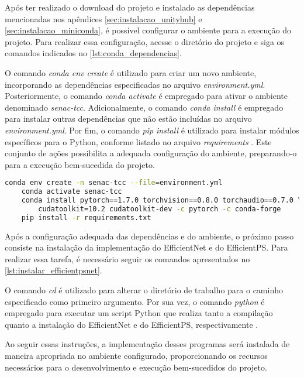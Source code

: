Após ter realizado o download do projeto e instalado as dependências mencionadas nos apêndices \ref{sec:instalacao_unityhub} e \ref{sec:instalacao_miniconda}, é possível configurar o ambiente para a execução do projeto. Para realizar essa configuração, acesse o diretório do projeto e siga os comandos indicados no \cref{lst:conda_dependencias}.

O comando \emph{conda env create} é utilizado para criar um novo ambiente, incorporando as dependências especificadas no arquivo \emph{environment.yml}. Posteriormente, o comando \emph{conda activate} é empregado para ativar o ambiente denominado \emph{senac-tcc}. Adicionalmente, o comando \emph{conda install} é empregado para instalar outras dependências que não estão incluídas no arquivo \emph{environment.yml}. Por fim, o comando \emph{pip install} é utilizado para instalar módulos específicos para o Python, conforme listado no arquivo \emph{requirements} \cite{conda_env_create,conda_deep_dives_activation,conda_install,pip_install}. Este conjunto de ações possibilita a adequada configuração do ambiente, preparando-o para a execução bem-sucedida do projeto.

\begin{lstlisting}[caption={Trecho com instruções para instalação de dependências utilizando conda e pip \cite{efficientpsGit}},label={lst:conda_dependencias},language=Bash,showstringspaces=false]
    conda env create -n senac-tcc --file=environment.yml
    conda activate senac-tcc
    conda install pytorch==1.7.0 torchvision==0.8.0 torchaudio==0.7.0 \
        cudatoolkit=10.2 cudatoolkit-dev -c pytorch -c conda-forge
    pip install -r requirements.txt
\end{lstlisting}

Após a configuração adequada das dependências e do ambiente, o próximo passo consiste na instalação da implementação do EfficientNet e do EfficientPS. Para realizar essa tarefa, é necessário seguir os comandos apresentados no \cref{lst:instalar_efficientpsnet}.

O comando \emph{cd} é utilizado para alterar o diretório de trabalho para o caminho especificado como primeiro argumento. Por sua vez, o comando \emph{python} é empregado para executar um script Python que realiza tanto a compilação quanto a instalação do EfficientNet e do EfficientPS, respectivamente \cite{cd_3tcl,efficientpsGit}.

Ao seguir essas instruções, a implementação desses programas será instalada de maneira apropriada no ambiente configurado, proporcionando os recursos necessários para o desenvolvimento e execução bem-sucedidos do projeto.

